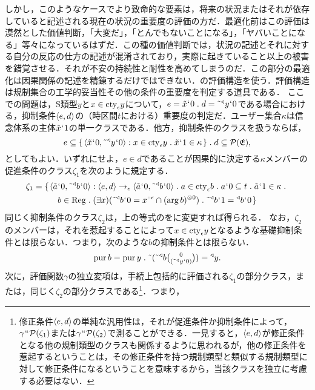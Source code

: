しかし，このようなケースでより致命的な要素は，将来の状況またはそれが依存していると記述される現在の状況の重要度の評価の方だ．最適化前はこの評価は漠然とした価値判断，「大変だ」，「とんでもないことになる」，「ヤバいことになる」等々になっているはずだ．この種の価値判断では，状況の記述とそれに対する自分の反応の仕方の記述が混淆されており，実際に起きていること以上の被害を錯覚させる．それが不安の持続性と耐性を高めてしまうのだ．この部分の最適化は因果関係の記述を精錬するだけではできない．の評価構造を使う．評価構造は規制集合の工学的妥当性その他の条件の重要度を判定する道具である．
ここでの問題は，S類型$y$と$ x\in\mathrm{cty}_{\epsilon}y $について，$ e = \tilde{x}\fap 0\con{1}d = \tildel{\trgl{y}}\fap 0 $である場合における，抑制条件$\langle e,d \rangle$の（時区間$t$における）重要度の判定だ．ユーザー集合$\kappa$は信念体系の主体$ \tilde{x}{\mspace{1mu}{`}\mspace{1mu}} 1 $の単一クラスである．他方，抑制条件のクラスを扱うならば，
\[
    e \subseteq \classab{\orp{\tilde{x}\fap 0,\tildel{\trgl{y}}\fap 0}:x\in\cty{\epsilon}y\con{1}\tilde{x}\fap 1 \in\kappa}\con{1}
    d \subseteq \mathcal{P}(\mathfrak{E}),
\]
としてもよい．いずれにせよ，$ e\in d $であることが因果的に決定する$ \kappa $メンバーの促進条件のクラス$\zeta_1$を次のように規定する．
\begin{multline*}
    \zeta_1 = \classab{\orp{\tilde{a}\fap 0,\tildel{\trgl{b}}\fap 0}:
    \orp{e,d}\to_{\epsilon}\orp{\tilde{a}\fap 0,\tildel{\trgl{b}}\fap 0}\con{1}a\in\cty{\epsilon}b\con{1}
    a\fap 0\subseteq t\con{1}\tilde{a}\fap 1 \in \kappa\con{1}\\
    b\in\mathrm{Reg}\con{1}
    (\exists x)(\tildel{\trgl{b}}\fap 0 = x^{::\epsilon}\cap\mser{(\arg b)}{0})\con{1}
    \tildel{\trgl{b}}\fap 1 = \trgl{b}\fap 0
    }
\end{multline*}
同じく抑制条件のクラス$\zeta_2$は，上の等式のをに変更すれば得られる．
なお，$\zeta_2$のメンバーは，それを惹起することによって$x\in\mathrm{cty}_{\epsilon}y$となるような基礎抑制条件とは限らない．つまり，次のような$b$の抑制条件とは限らない．
\[
    \mathrm{pur}\,b = \mathrm{pur}\,y\con{1}\tildel{(\tildel{\trgl{b}}\tbinom{0}{(\tildel{\trgl{y}}\fap 0)})} = \trgl{y}.
\]
次に，評価関数$\gamma$の独立変項は，手続上包括的に評価される$\zeta_1$の部分クラス，または，同じく$\zeta_2$の部分クラスである\footnote{
    修正条件$ \langle e,d \rangle $の単純な汎用性は，それが促進条件か抑制条件によって，$\gamma{\mspace{1mu}{``}\mspace{1mu}}\mathcal{P}(\zeta_1)$または$\gamma{\mspace{1mu}{``}\mspace{1mu}}\mathcal{P}(\zeta_2)$で測ることができる．一見すると，$\langle e,d \rangle$が修正条件となる他の規制類型のクラスも関係するように思われるが，他の修正条件を惹起するということは，その修正条件を持つ規制類型と類似する規制類型に対して修正条件になるということを意味するから，当該クラスを独立に考慮する必要はない．
}．つまり，
